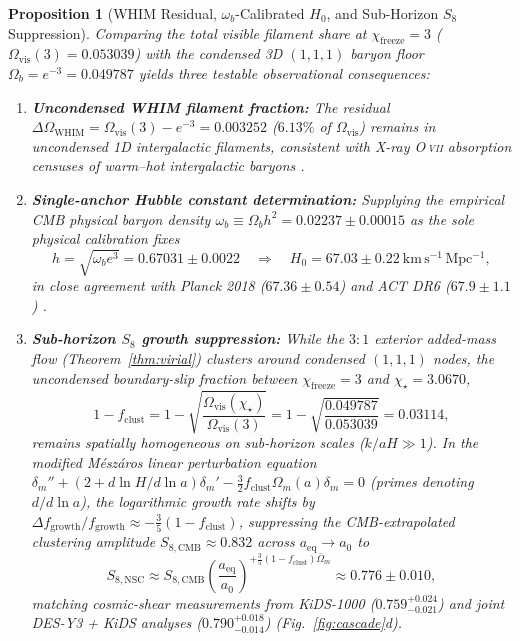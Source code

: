 \documentclass[pdflatex,sn-mathphys-num]{sn-jnl}
\theoremstyle{thmstyleone}
\newtheorem{proposition}[theorem]{Proposition}
\theoremstyle{thmstyletwo}
\theoremstyle{thmstylethree}
\begin{document}
\begin{proposition}[WHIM Residual, $\omega_b$-Calibrated $H_0$, and Sub-Horizon $S_8$ Suppression]\label{prop:observables}
Comparing the total visible filament share at $\chi_{\mathrm{freeze}}=3$ ($\Omega_{\mathrm{vis}}(3) = 0.053039$) with the condensed 3D $(1,1,1)$ baryon floor $\Omega_b = e^{-3} = 0.049787$ yields three testable observational consequences:
\begin{enumerate}
\item \textbf{Uncondensed WHIM filament fraction:} The residual $\Delta\Omega_{\mathrm{WHIM}} = \Omega_{\mathrm{vis}}(3) - e^{-3} = 0.003252$ ($6.13\%$ of $\Omega_{\mathrm{vis}}$) remains in uncondensed 1D intergalactic filaments, consistent with X-ray O\,\textsc{vii} absorption censuses of warm--hot intergalactic baryons \cite{Nicastro2018}.
\item \textbf{Single-anchor Hubble constant determination:} Supplying the empirical CMB physical baryon density $\omega_b \equiv \Omega_b h^2 = 0.02237 \pm 0.00015$ \cite{Planck2018} as the sole physical calibration fixes
\begin{equation}\label{eq:h0_eval}
h = \sqrt{\omega_b e^3} = 0.67031 \pm 0.0022 \quad \Longrightarrow \quad H_0 = 67.03 \pm 0.22\ \mathrm{km\,s^{-1}\,Mpc^{-1}},
\end{equation}
in close agreement with Planck 2018 ($67.36 \pm 0.54$) \cite{Planck2018} and ACT DR6 ($67.9 \pm 1.1$) \cite{ACTDR6_2024}.
\item \textbf{Sub-horizon $S_8$ growth suppression:} While the $3:1$ exterior added-mass flow (Theorem~\ref{thm:virial}) clusters around condensed $(1,1,1)$ nodes, the uncondensed boundary-slip fraction between $\chi_{\mathrm{freeze}}=3$ and $\chi_\star=3.0670$,
\begin{equation}\label{eq:f_clust}
1 - f_{\mathrm{clust}} = 1 - \sqrt{\frac{\Omega_{\mathrm{vis}}(\chi_\star)}{\Omega_{\mathrm{vis}}(3)}} = 1 - \sqrt{\frac{0.049787}{0.053039}} = 0.03114,
\end{equation}
remains spatially homogeneous on sub-horizon scales ($k/aH \gg 1$). In the modified M\'{e}sz\'{a}ros linear perturbation equation $\delta_m'' + (2 + d\ln H/d\ln a)\delta_m' - \frac{3}{2}f_{\mathrm{clust}}\Omega_m(a)\delta_m = 0$ (primes denoting $d/d\ln a$), the logarithmic growth rate shifts by $\Delta f_{\mathrm{growth}}/f_{\mathrm{growth}} \approx -\frac{3}{5}(1 - f_{\mathrm{clust}})$, suppressing the CMB-extrapolated clustering amplitude $S_{8,\mathrm{CMB}} \approx 0.832$ \cite{Planck2018} across $a_{\mathrm{eq}} \to a_0$ to
\begin{equation}\label{eq:s8_eval}
S_{8,\mathrm{NSC}} \approx S_{8,\mathrm{CMB}}\left(\frac{a_{\mathrm{eq}}}{a_0}\right)^{+\frac{3}{5}(1 - f_{\mathrm{clust}})\bar{\Omega}_m} \approx 0.776 \pm 0.010,
\end{equation}
matching cosmic-shear measurements from KiDS-1000 ($0.759^{+0.024}_{-0.021}$) \cite{KiDS1000_2021} and joint DES-Y3 + KiDS analyses ($0.790^{+0.018}_{-0.014}$) \cite{DESY3_KiDS_2023} (Fig.~\ref{fig:cascade}d).
\end{enumerate}
\end{proposition}
\end{document}
